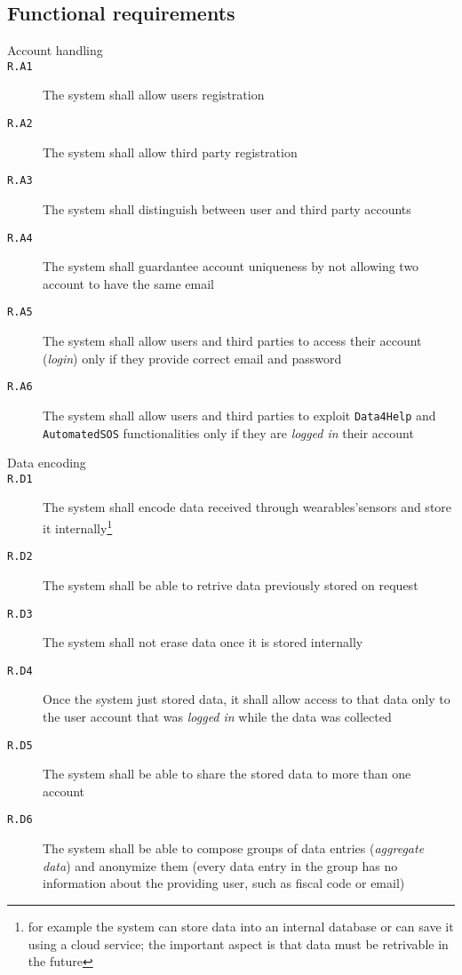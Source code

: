 
  \subsection{Functional requirements}

    \begin{description}
      \item[Account handling]
      \item[\texttt{R.A1}] The system shall allow users registration
      \item[\texttt{R.A2}] The system shall allow third party registration
      \item[\texttt{R.A3}] The system shall distinguish between user and third party accounts
      \item[\texttt{R.A4}] The system shall guardantee account uniqueness by not allowing two account to have the same email
      \item[\texttt{R.A5}] The system shall allow users and third parties to access their account (\textit{login}) only if they provide correct email and password
      \item[\texttt{R.A6}] The system shall allow users and third parties to exploit \texttt{Data4Help} and \texttt{AutomatedSOS} functionalities only if they are \textit{logged in} their account

      \item[Data encoding]
      \item[\texttt{R.D1}] The system shall encode data received through wearables'sensors and store it internally\footnote{for example the system can store data into an internal database or can save it using a cloud service; the important aspect is that data must be retrivable in the future}
      \item[\texttt{R.D2}] The system shall be able to retrive data previously stored on request
      \item[\texttt{R.D3}] The system shall not erase data once it is stored internally
      \item[\texttt{R.D4}] Once the system just stored data, it shall allow access to that data only to the user account that was \textit{logged in} while the data was collected
      \item[\texttt{R.D5}] The system shall be able to share the stored data to more than one account
      \item[\texttt{R.D6}] The system shall be able to compose groups of data entries (\textit{aggregate data}) and anonymize them (every data entry in the group has no information about the providing user, such as fiscal code or email)


\end{description}
